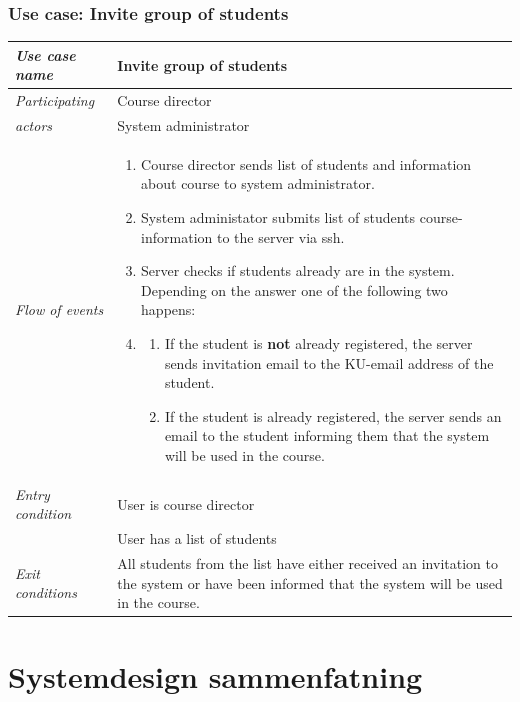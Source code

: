 \documentclass[11pt,a4paper]{report}
\begin{document}
\subsubsection{Use case: Invite group of students}
\begin{tabular}{l p{}}
    \toprule
    \textit{Use case name} & Invite group of students\\
    \midrule
    \textit{Participating} & Course director \\
    \textit{actors} & System administrator \\
    \midrule
    \textit{Flow of events} &
    \vspace{-6.7mm} \begin{enumerate}
        \item Course director sends list of students and information about course to system administrator.
        \item System administator submits list of students course-information to the server via ssh.
        \item Server checks if students already are in the system. Depending on the answer one of the following two happens:
        \item
        \begin{enumerate}
            \item If the student is \textbf{not} already registered, the server sends invitation email to the KU-email address of the student.
            \item If the student is already registered, the server sends an email to the student informing them that the system will be used in the course.
        \end{enumerate}
    \end{enumerate}
    \\
    \midrule
    \textit{Entry condition} & User is course director \\
                             & User has a list of students \\
    \midrule
    \textit{Exit conditions} & All students from the list have either received an invitation to the system or have been informed that the system will be used in the course. \\
    \bottomrule
\end{tabular}

\section{Systemdesign sammenfatning}
\end{document}
